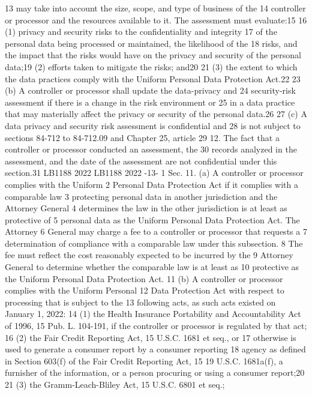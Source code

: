 13 may take into account the size, scope, and type of business of the
14 controller or processor and the resources available to it. The assessment
must evaluate:15
16 (1) privacy and security risks to the confidentiality and integrity
17 of the personal data being processed or maintained, the likelihood of the
18 risks, and the impact that the risks would have on the privacy and
security of the personal data;19
(2) efforts taken to mitigate the risks; and20
21 (3) the extent to which the data practices comply with the Uniform
Personal Data Protection Act.22
23 (b) A controller or processor shall update the data-privacy and
24 security-risk assessment if there is a change in the risk environment or
25 in a data practice that may materially affect the privacy or security of
the personal data.26
27 (c) A data privacy and security risk assessment is confidential and
28 is not subject to sections 84-712 to 84-712.09 and Chapter 25, article
29 12. The fact that a controller or processor conducted an assessment, the
30 records analyzed in the assessment, and the date of the assessment are
not confidential under this section.31
LB1188
2022
LB1188
2022
-13-
1 Sec. 11. (a) A controller or processor complies with the Uniform
2 Personal Data Protection Act if it complies with a comparable law
3 protecting personal data in another jurisdiction and the Attorney General
4 determines the law in the other jurisdiction is at least as protective of
5 personal data as the Uniform Personal Data Protection Act. The Attorney
6 General may charge a fee to a controller or processor that requests a
7 determination of compliance with a comparable law under this subsection.
8 The fee must reflect the cost reasonably expected to be incurred by the
9 Attorney General to determine whether the comparable law is at least as
10 protective as the Uniform Personal Data Protection Act.
11 (b) A controller or processor complies with the Uniform Personal
12 Data Protection Act with respect to processing that is subject to the
13 following acts, as such acts existed on January 1, 2022:
14 (1) the Health Insurance Portability and Accountability Act of 1996,
15 Pub. L. 104-191, if the controller or processor is regulated by that act;
16 (2) the Fair Credit Reporting Act, 15 U.S.C. 1681 et seq., or
17 otherwise is used to generate a consumer report by a consumer reporting
18 agency as defined in Section 603(f) of the Fair Credit Reporting Act, 15
19 U.S.C. 1681a(f), a furnisher of the information, or a person procuring or
using a consumer report;20
21 (3) the Gramm-Leach-Bliley Act, 15 U.S.C. 6801 et seq.;
